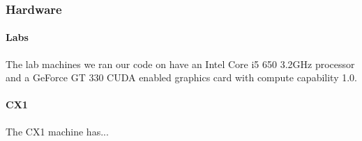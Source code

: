 \subsubsection*{Hardware}
\paragraph{Labs}
  The lab machines we ran our code on have an Intel Core i5 650 3.2GHz processor and a  GeForce GT 330 CUDA enabled graphics card with compute capability 1.0.
\paragraph{CX1}
  The CX1 machine has...